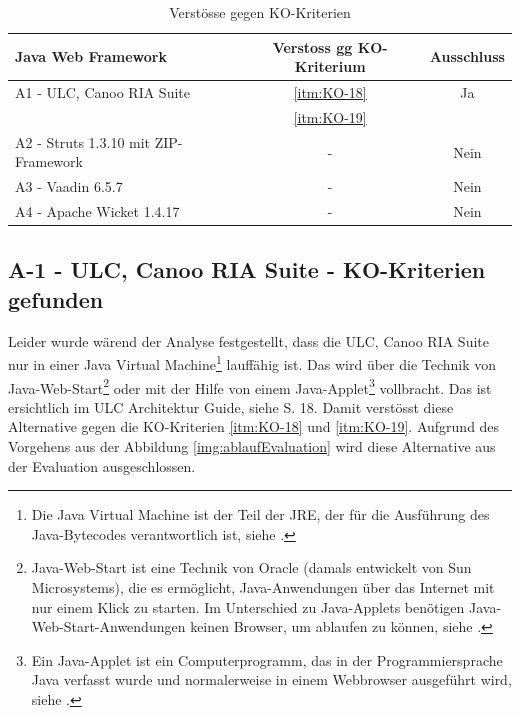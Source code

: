  \begin{table}[!h]
    \sffamily 
    \begin{center}
      \begin{tabular}{lcc}
        \toprule
        Java Web Framework & Verstoss gg KO-Kriterium & Ausschluss\\
        \midrule
        A1 - ULC, Canoo RIA Suite & \ref{itm:KO-18} & Ja\\
        & \ref{itm:KO-19} &\\
        A2 - Struts 1.3.10 mit ZIP-Framework & - & Nein\\
        A3 - Vaadin 6.5.7 & - & Nein\\
        A4 - Apache Wicket 1.4.17 & - & Nein\\
        \bottomrule
      \end{tabular}
      \caption{Verstösse gegen KO-Kriterien}
      \label{tab:gefundeneKOKriterien}
    \end{center}
  \end{table}

  \subsection{A-1 - ULC, Canoo RIA Suite - KO-Kriterien gefunden}
  
  Leider wurde wärend der Analyse festgestellt, dass die ULC, Canoo RIA Suite
  nur in einer Java Virtual Machine\footnote{Die Java Virtual Machine ist der
  Teil der \ac{JRE}, der für die Ausführung des Java-Bytecodes verantwortlich
  ist, siehe \cite{JavaVirtualMachine}.} lauffähig ist. Das wird über die
  Technik von Java-Web-Start\footnote{Java-Web-Start ist eine Technik von
  Oracle (damals entwickelt von Sun Microsystems), die es ermöglicht, Java-Anwendungen
  über das Internet mit nur einem Klick zu starten. Im Unterschied zu
  Java-Applets benötigen Java-Web-Start-Anwendungen keinen Browser, um ablaufen
  zu können, siehe \cite{JavaWebStart}.} oder mit der Hilfe von einem
  Java-Applet\footnote{Ein Java-Applet ist ein Computerprogramm, das in der
  Programmiersprache Java verfasst wurde und normalerweise in einem Webbrowser
  ausgeführt wird, siehe \cite{JavaApplet}.} vollbracht. Das ist ersichtlich im
  ULC Architektur Guide, siehe \cite{ULCArchitectureGuide} S. 18. Damit
  verstösst diese Alternative gegen die KO-Kriterien \ref{itm:KO-18} und
  \ref{itm:KO-19}. Aufgrund des Vorgehens aus der Abbildung
  \ref{img:ablaufEvaluation} wird diese Alternative aus der Evaluation
  ausgeschlossen.
  
